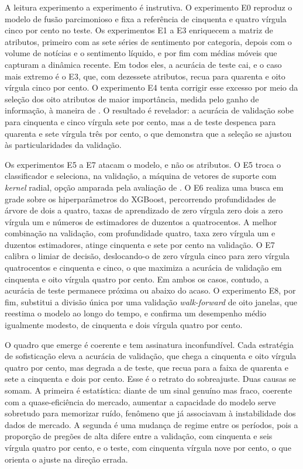 A leitura experimento a experimento é instrutiva. O experimento E0 reproduz o modelo de fusão parcimonioso e fixa a referência de cinquenta e quatro vírgula cinco por cento no teste. Os experimentos E1 a E3 enriquecem a matriz de atributos, primeiro com as sete séries de sentimento por categoria, depois com o volume de notícias e o sentimento líquido, e por fim com médias móveis que capturam a dinâmica recente. Em todos eles, a acurácia de teste cai, e o caso mais extremo é o E3, que, com dezessete atributos, recua para quarenta e oito vírgula cinco por cento. O experimento E4 tenta corrigir esse excesso por meio da seleção dos oito atributos de maior importância, medida pelo ganho de informação, à maneira de . O resultado é revelador: a acurácia de validação sobe para cinquenta e cinco vírgula sete por cento, mas a de teste despenca para quarenta e sete vírgula três por cento, o que demonstra que a seleção se ajustou às particularidades da validação.

Os experimentos E5 a E7 atacam o modelo, e não os atributos. O E5 troca o classificador e seleciona, na validação, a máquina de vetores de suporte com \textit{kernel} radial, opção amparada pela avaliação de . O E6 realiza uma busca em grade sobre os hiperparâmetros do XGBoost, percorrendo profundidades de árvore de dois a quatro, taxas de aprendizado de zero vírgula zero dois a zero vírgula um e números de estimadores de duzentos a quatrocentos. A melhor combinação na validação, com profundidade quatro, taxa zero vírgula um e duzentos estimadores, atinge cinquenta e sete por cento na validação. O E7 calibra o limiar de decisão, deslocando-o de zero vírgula cinco para zero vírgula quatrocentos e cinquenta e cinco, o que maximiza a acurácia de validação em cinquenta e oito vírgula quatro por cento. Em ambos os casos, contudo, a acurácia de teste permanece próxima ou abaixo do acaso. O experimento E8, por fim, substitui a divisão única por uma validação \textit{walk-forward} de oito janelas, que reestima o modelo ao longo do tempo, e confirma um desempenho médio igualmente modesto, de cinquenta e dois vírgula quatro por cento.

O quadro que emerge é coerente e tem assinatura inconfundível. Cada estratégia de sofisticação eleva a acurácia de validação, que chega a cinquenta e oito vírgula quatro por cento, mas degrada a de teste, que recua para a faixa de quarenta e sete a cinquenta e dois por cento. Esse é o retrato do sobreajuste. Duas causas se somam. A primeira é estatística: diante de um sinal genuíno mas fraco, coerente com a quase-eficiência do mercado, aumentar a capacidade do modelo serve sobretudo para memorizar ruído, fenômeno que  já associavam à instabilidade dos dados de mercado. A segunda é uma mudança de regime entre os períodos, pois a proporção de pregões de alta difere entre a validação, com cinquenta e seis vírgula quatro por cento, e o teste, com cinquenta vírgula nove por cento, o que orienta o ajuste na direção errada.


